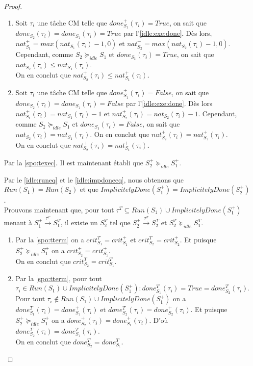 \documentclass[12pt,a4paper,oneside]{book}
\theoremstyle{break}
\theoremstyle{breakplain}
\begin{document}
\begin{proof}
\begin{enumerate}
\item Soit $\tau_i$ une tâche CM telle que $done_{S_1}^+(\tau_i) = True$, on sait que $done_{S_2}(\tau_i) = done_{S_1}(\tau_i) = True$ par l'\autoref{idle:exe:done}. Dès lors, $nat_{S_1}^+ = max(nat_{S_1}(\tau_i)-1, 0)$ et $nat_{S_2}^+ = max(nat_{S_2}(\tau_i)-1, 0)$. Cependant, comme $S_2 \succeq_{idle} S_1$ et $done_{S_1}(\tau_i) = True$, on sait que $nat_{S_2}(\tau_i) \leq nat_{S_1}(\tau_i)$.\\
On en conclut que $nat_{S_2}^+(\tau_i) \leq nat_{S_1}^+(\tau_i)$.

\item Soit $\tau_i$ une tâche CM telle que $done_{S_1}^+(\tau_i) = False$, on sait que $done_{S_2}(\tau_i) = done_{S_1}(\tau_i) = False$ par l'\autoref{idle:exe:done}. Dès lors $ nat_{S_1}^+(\tau_i) = nat_{S_1}(\tau_i)-1$ et $nat_{S_2}^+(\tau_i) = nat_{S_2}(\tau_i)-1$. Cependant, comme $S_2 \succeq_{idle} S_1$ et $done_{S_1}(\tau_i) = False$, on sait que $nat_{S_2}(\tau_i) = nat_{S_1}(\tau_i)$. On en conclut que $nat_{S_2}^+(\tau_i) = nat_{S_1}^+(\tau_i)$.\\
On en conclut que $nat_{S_2}^+(\tau_i) = nat_{S_1}^+(\tau_i)$.\\
\end{enumerate}

Par la \autoref{spo:texec}. Il est maintenant établi que $S^+_2 \succeq_{idle} S^+_1$.\\

\pagebreak

Par le \autoref{idle:runeq} et le \autoref{idle:impdoneeq}, nous obtenons que $Run(S_1) = Run(S_2)$ et que $ImplicitelyDone(S^+_1) = ImplicitelyDone(S_2^+)$.\\
Prouvons maintenant que, pour tout $\tau^T\subseteq Run(S_1) \cup ImplicitelyDone(S_1^+)$ menant à $S_1^+ \xrightarrow{\tau^T} S_1^T$, il existe un $S_2^T$ tel que $S_2^+ \xrightarrow{\tau^T} S_2^T$ et $S_2^T \succeq_{idle} S_1^T$.

\begin{enumerate}
\item Par la \autoref{spo:tterm} on a $crit_{S_1}^T = crit_{S_1}^+$ et $crit_{S_2}^T = crit_{S_2}^+$. Et puisque $S^+_2 \succeq_{idle} S^+_1$ on a $crit_{S_2}^+= crit_{S_1}^+$.\\
On en conclut que $crit_{S_2}^T= crit_{S_1}^T$.

\item \label{idle:term:done} Par la \autoref{spo:tterm}, pour tout $\tau_i \in Run(S_1) \cup ImplicitelyDone(S_1^+) : done_{S_1}^T(\tau_i) = True = done_{S_2}^T(\tau_i)$.\\
Pour tout $\tau_i \notin Run(S_1) \cup ImplicitelyDone(S_1^+)$ on a $done_{S_1}^T(\tau_i) = done_{S_1}^+(\tau_i)$ et $done_{S_2}^T(\tau_i) = done_{S_2}^+(\tau_i)$. Et puisque $S^+_2 \succeq_{idle} S^+_1$ on a $done_{S_2}^+(\tau_i)= done_{S_1}^+(\tau_i)$. D'où $done_{S_2}^T(\tau_i) = done_{S_1}^T(\tau_i)$.\\
On en conclut que $done_{S_2}^T = done_{S_1}^T$.


\end{enumerate}
\end{proof}
\end{document}
